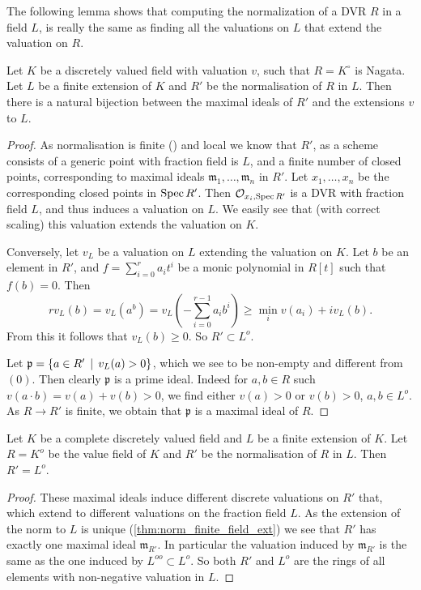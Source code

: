 The following lemma shows that computing the normalization of a DVR $R$ in a field $L$, is really the same as finding all the valuations on $L$ that extend the valuation on $R$. 
\begin{lemma}\label{lem:normalisation_extension_norm}
	Let $K$ be a discretely valued field with valuation $v$, such that $R = K^{\circ}$ is Nagata. 
	Let $L$ be a finite extension of $K$ and $R'$ be the normalisation of $R$ in $L$. 
	Then there is a natural bijection between the maximal ideals of $R'$ and the extensions $v $ to $L$. 
\end{lemma}
\begin{proof}
	As normalisation is finite () and local we know that $R'$, as a scheme consists of a generic point with fraction field is $L$, and a finite number of closed points, corresponding to maximal ideals $\mathfrak{m}_1, \ldots, \mathfrak{m} _n $ in $R'$. 
	Let $x_1, \ldots, x_n$ be the corresponding closed points in $\operatorname{Spec} R'$. 
	Then $\mathcal{O}_{x_i, \operatorname{Spec} R'}$ is a DVR with fraction field $L$, and thus induces a valuation on $L$. 
	We easily see that (with correct scaling) this valuation extends the valuation on $K$. 

	Conversely, let $v_L$ be a valuation on $L$ extending the valuation on $K$. 
	Let $b$ be an element in $R'$, and $f = \sum_{i = 0}^{r} a_i t^{i}$ be a monic polynomial in $R[t]$ such that $f(b) = 0$. 
	Then \[
		rv_L(b) = v_L(a^{b}) = v_L \left(-\sum_{i = 0}^{r-1} a_i b^{i}\right) \ge \min_{i} v(a_i) + iv_L(b)
	.\] 
	From this it follows that $v_L(b) \ge 0$. 
	So $R' \subset L^{o}$.  

	Let $\mathfrak{p}  = \{a \in R' \st v_L(a) > 0\} $, which we see to be non-empty and different from $(0)$. 
	Then clearly $\mathfrak{p} $ is a prime ideal.
	Indeed for $a, b \in R$  such $v(a \cdot b) = v(a) + v(b) > 0$, we find either $v(a) > 0$ or $v(b) > 0$, $a, b \in L^{o}$. 
	As $R \to R'$ is finite, we obtain that $\mathfrak{p} $ is a maximal ideal of $R$. 
\end{proof}

\begin{lemma}
	Let $K$ be a complete discretely valued field and $L$ be a finite extension of $K$.	Let $R = K^{o}$  be the value field of $K$ and $R'$ be the normalisation of $R$ in $L$. 
	Then $R' = L^{o}$. 
\end{lemma}
\begin{proof}
	These maximal ideals induce different discrete valuations on $R'$ that, which extend to different valuations on the fraction field $L$. 
	As the extension of the norm to $L$ is unique (\cref{thm:norm_finite_field_ext}) we see that $R'$ has exactly one maximal ideal $\mathfrak{m}_{R'}$. 
	In particular the valuation induced by $\mathfrak{m}_{R'} $ is the same as the one induced by $L^{oo} \subset L^{o}$. 
	So both $R'$ and $L^{o}$ are the rings of all elements with non-negative valuation in $L$. 
\end{proof}

